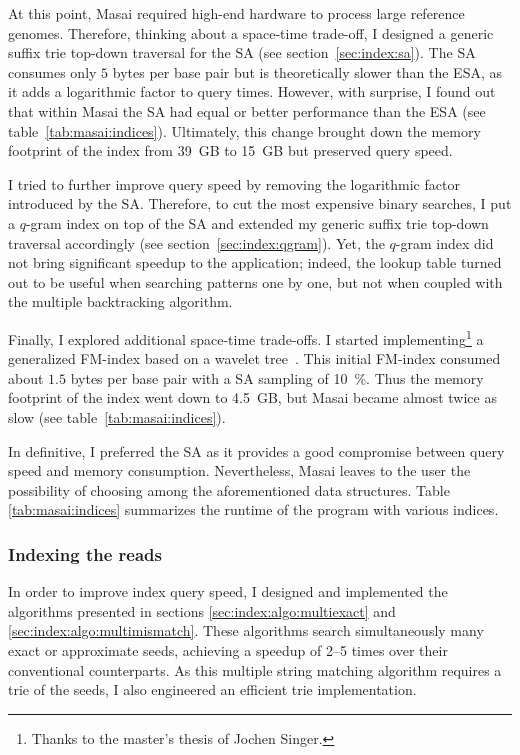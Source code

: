 At this point, Masai required high-end hardware to process large reference genomes.
Therefore, thinking about a space-time trade-off, I designed a generic suffix trie top-down traversal for the SA (see section~\ref{sec:index:sa}).
The SA consumes only $5$ bytes per base pair but is theoretically slower than the ESA, as it adds a logarithmic factor to query times.
However, with surprise, I found out that within Masai the SA had equal or better performance than the ESA (see table~\ref{tab:masai:indices}).
Ultimately, this change brought down the memory footprint of the index from 39~GB to 15~GB but preserved query speed.

I tried to further improve query speed by removing the logarithmic factor introduced by the SA.
Therefore, to cut the most expensive binary searches, I put a $q$-gram index on top of the SA and extended my generic suffix trie top-down traversal accordingly (see section~\ref{sec:index:qgram}).
Yet, the $q$-gram index did not bring significant speedup to the application;
indeed, the lookup table turned out to be useful when searching patterns one by one, but not when coupled with the multiple backtracking algorithm.

Finally, I explored additional space-time trade-offs.
I started implementing\footnote{Thanks to the master's thesis of Jochen Singer.} a generalized FM-index based on a wavelet tree~\citep{Grossi2003}.
This initial FM-index consumed about $1.5$ bytes per base pair with a SA sampling of 10~\%.
Thus the memory footprint of the index went down to 4.5~GB, but Masai became almost twice as slow (see table~\ref{tab:masai:indices}).

In definitive, I preferred the SA as it provides a good compromise between query speed and memory consumption.
Nevertheless, Masai leaves to the user the possibility of choosing among the aforementioned data structures.
Table \ref{tab:masai:indices} summarizes the runtime of the program with various indices.

\subsubsection{Indexing the reads}

In order to improve index query speed, I designed and implemented the algorithms presented in sections \ref{sec:index:algo:multiexact} and \ref{sec:index:algo:multimismatch}.
These algorithms search simultaneously many exact or approximate seeds, achieving a speedup of 2--5 times over their conventional counterparts.
As this multiple string matching algorithm requires a trie of the seeds, I also engineered an efficient trie implementation.

